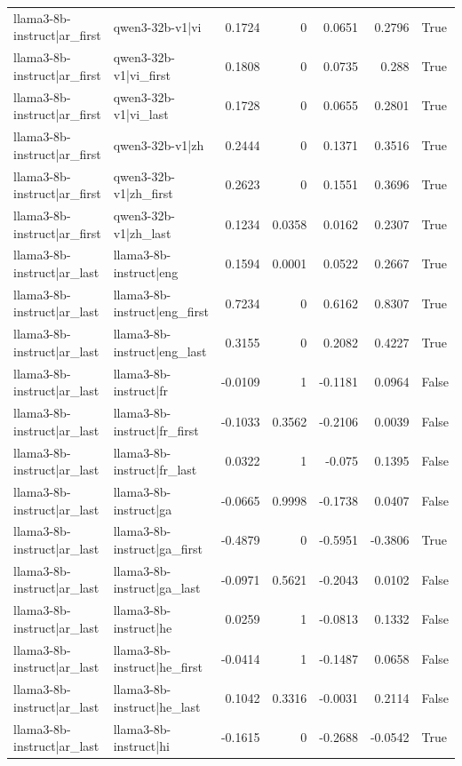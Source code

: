 \begin{table}
\begin{tabular}{l l r r r r l}
llama3-8b-instruct|ar_first & qwen3-32b-v1|vi & 0.1724 & 0 & 0.0651 & 0.2796 & True \\
llama3-8b-instruct|ar_first & qwen3-32b-v1|vi_first & 0.1808 & 0 & 0.0735 & 0.288 & True \\
llama3-8b-instruct|ar_first & qwen3-32b-v1|vi_last & 0.1728 & 0 & 0.0655 & 0.2801 & True \\
llama3-8b-instruct|ar_first & qwen3-32b-v1|zh & 0.2444 & 0 & 0.1371 & 0.3516 & True \\
llama3-8b-instruct|ar_first & qwen3-32b-v1|zh_first & 0.2623 & 0 & 0.1551 & 0.3696 & True \\
llama3-8b-instruct|ar_first & qwen3-32b-v1|zh_last & 0.1234 & 0.0358 & 0.0162 & 0.2307 & True \\
llama3-8b-instruct|ar_last & llama3-8b-instruct|eng & 0.1594 & 0.0001 & 0.0522 & 0.2667 & True \\
llama3-8b-instruct|ar_last & llama3-8b-instruct|eng_first & 0.7234 & 0 & 0.6162 & 0.8307 & True \\
llama3-8b-instruct|ar_last & llama3-8b-instruct|eng_last & 0.3155 & 0 & 0.2082 & 0.4227 & True \\
llama3-8b-instruct|ar_last & llama3-8b-instruct|fr & -0.0109 & 1 & -0.1181 & 0.0964 & False \\
llama3-8b-instruct|ar_last & llama3-8b-instruct|fr_first & -0.1033 & 0.3562 & -0.2106 & 0.0039 & False \\
llama3-8b-instruct|ar_last & llama3-8b-instruct|fr_last & 0.0322 & 1 & -0.075 & 0.1395 & False \\
llama3-8b-instruct|ar_last & llama3-8b-instruct|ga & -0.0665 & 0.9998 & -0.1738 & 0.0407 & False \\
llama3-8b-instruct|ar_last & llama3-8b-instruct|ga_first & -0.4879 & 0 & -0.5951 & -0.3806 & True \\
llama3-8b-instruct|ar_last & llama3-8b-instruct|ga_last & -0.0971 & 0.5621 & -0.2043 & 0.0102 & False \\
llama3-8b-instruct|ar_last & llama3-8b-instruct|he & 0.0259 & 1 & -0.0813 & 0.1332 & False \\
llama3-8b-instruct|ar_last & llama3-8b-instruct|he_first & -0.0414 & 1 & -0.1487 & 0.0658 & False \\
llama3-8b-instruct|ar_last & llama3-8b-instruct|he_last & 0.1042 & 0.3316 & -0.0031 & 0.2114 & False \\
llama3-8b-instruct|ar_last & llama3-8b-instruct|hi & -0.1615 & 0 & -0.2688 & -0.0542 & True \\

\end{tabular}
\end{table}
